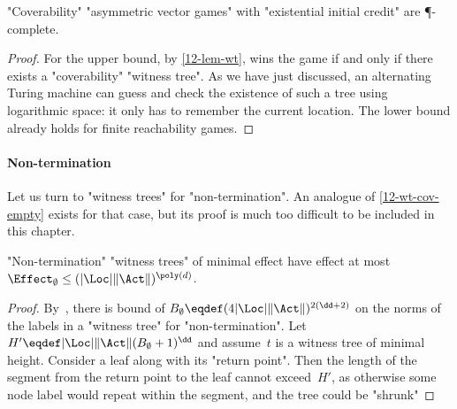 \begin{theorem}\label{12-cov-exist-P}
  "Coverability" "asymmetric vector games" with "existential initial
  credit" are \P-complete.
\end{theorem}
\begin{proof}
  For the upper bound, by \cref{12-lem-wt}, \Eve wins the game if and
  only if there exists a "coverability" "witness tree".  As we have
  just discussed, an alternating Turing machine can guess and check
  the existence of such a tree using logarithmic space: it only has to
  remember the current location.  The lower bound already holds for
  finite reachability games.
\end{proof}

\paragraph{Non-termination}
Let us turn to "witness trees" for "non-termination".  An analogue
of \cref{12-wt-cov-empty} exists for that case, but its proof is much
too difficult to be included in this chapter.
\begin{claim}
  "Non-termination" "witness trees" of minimal effect have effect at most
  $\Effect_\emptyset\leq(|\Loc|\|\Act\|)^{\poly(d)}$.
\end{claim}
\begin{proof}
  By~\cite{Jurdzinski&Lazic&Schmitz:2015}, there is bound of
  $B_\emptyset\eqdef(4|\Loc|\|\Act\|)^{2(\dd+2)}$ on the norms of the
  labels in a "witness tree" for "non-termination".  Let $H'\eqdef
  |\Loc|\|\Act\| (B_\emptyset+1)^{\dd}$ and assume~$t$ is a witness
  tree of minimal height.  Consider a leaf along with its "return
  point".  Then the length of the segment from the return point to the
  leaf cannot exceed~$H'$, as otherwise some node label would repeat
  within the segment, and the tree could be "shrunk"
\end{proof}
